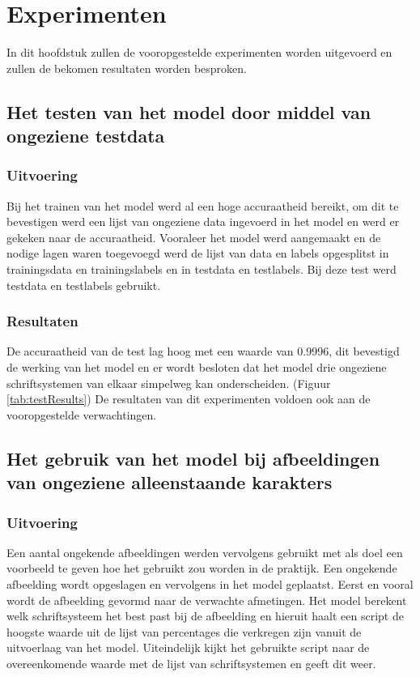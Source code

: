 \chapter{Experimenten}

In dit hoofdstuk zullen de vooropgestelde experimenten worden uitgevoerd en zullen de bekomen resultaten worden besproken.

\section{Het testen van het model door middel van ongeziene testdata}

\subsection{Uitvoering}


Bij het trainen van het model werd al een hoge accuraatheid bereikt, om dit te bevestigen werd een lijst van ongeziene data ingevoerd in het model en werd er gekeken naar de accuraatheid.
Vooraleer het model werd aangemaakt en de nodige lagen waren toegevoegd werd de lijst van data en labels opgesplitst in trainingsdata en trainingslabels en in testdata en testlabels.
Bij deze test werd testdata en testlabels gebruikt.

\subsection{Resultaten}

De accuraatheid van de test lag hoog met een waarde van 0.9996, dit bevestigd de werking van het model en er wordt besloten dat het model drie ongeziene schriftsystemen van elkaar simpelweg kan onderscheiden. (Figuur \ref{tab:testResults})
De resultaten van dit experimenten voldoen ook aan de vooropgestelde verwachtingen.

\section{Het gebruik van het model bij afbeeldingen van ongeziene alleenstaande karakters}

\subsection{Uitvoering}

Een aantal ongekende afbeeldingen werden vervolgens gebruikt met als doel een voorbeeld te geven hoe het gebruikt zou worden in de praktijk.
Een ongekende afbeelding wordt opgeslagen en vervolgens in het model geplaatst.
Eerst en vooral wordt de afbeelding gevormd naar de verwachte afmetingen.
Het model berekent welk schriftsysteem het best past bij de afbeelding en hieruit haalt een script de hoogste waarde uit de lijst van percentages die verkregen zijn vanuit de uitvoerlaag van het model.
Uiteindelijk kijkt het gebruikte script naar de overeenkomende waarde met de lijst van schriftsystemen en geeft dit weer.


